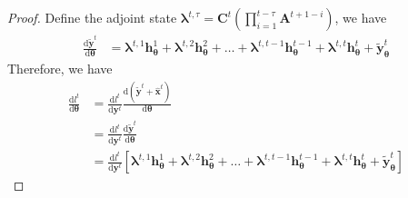 \documentclass{article}
\newtheorem{proof}{Proof}
\newcommand{\diff}{\mathrm{d}}
\newcommand{\blambda}{\boldsymbol{\lambda}}
\newcommand{\ka}[1]{{\color{brown} Kavosh: #1 }}
\begin{document}
\begin{proof}
Define the adjoint state $\blambda^{t,\tau}=\mathbf{C}^t(\prod_{i=1}^{t-\tau}\mathbf{A}^{t+1-i})$, we have
\begin{align*}
    \frac{\diff \tilde{\mathbf{y}}^t}{\diff\boldsymbol{\theta}} &= \blambda^{t,1}\mathbf{h}^1_{\boldsymbol{\theta}}+\blambda^{t,2}\mathbf{h}^2_{\boldsymbol{\theta}}+\dots+\blambda^{t,t-1}
\mathbf{h}^{t-1}_{\boldsymbol{\theta}}+\blambda^{t,t}\mathbf{h}^t_{\boldsymbol{\theta}}+\tilde{\mathbf{y}}^t_{\boldsymbol{\theta}}
\end{align*}
Therefore, we have
\begin{align*}
    \frac{\diff l^t}{\diff\boldsymbol{\theta}} &= \frac{\diff l^t}{\diff \mathbf{y}^t}\frac{\diff (\tilde{\mathbf{y}}^t+\hat{\mathbf{x}}^t)}{\diff\boldsymbol{\theta}}\\%
    &= \frac{\diff l^t}{\diff \mathbf{y}^t}\frac{\diff \tilde{\mathbf{y}}^t}{\diff\boldsymbol{\theta}}\\
    &= \frac{\diff l^t}{\diff \mathbf{y}^t} [\blambda^{t,1}\mathbf{h}^1_{\boldsymbol{\theta}}+\blambda^{t,2}\mathbf{h}^2_{\boldsymbol{\theta}}+\dots+\blambda^{t,t-1}\mathbf{h}^{t-1}_{\boldsymbol{\theta}}+\blambda^{t,t}\mathbf{h}^t_{\boldsymbol{\theta}}+\tilde{\mathbf{y}}^t_{\boldsymbol{\theta}}]
\end{align*}


\end{proof}
\end{document}
